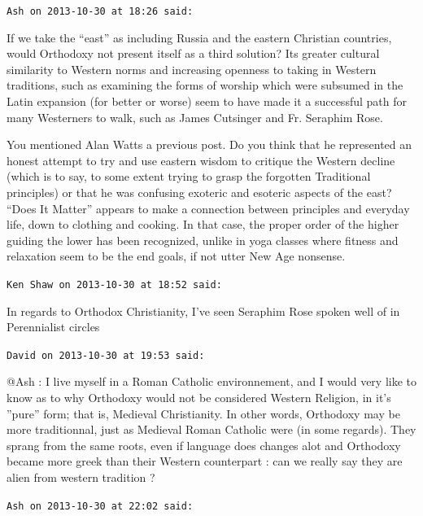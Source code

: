 \begin{footnotesize}
\begin{sffamily}
\hfill

\texttt{Ash on 2013-10-30 at 18:26 said:}

If we take the ``east'' as including Russia and the eastern Christian countries, would Orthodoxy not present itself as a third solution? Its greater cultural similarity to Western norms and increasing openness to taking in Western traditions, such as examining the forms of worship which were subsumed in the Latin expansion (for better or worse) seem to have made it a successful path for many Westerners to walk, such as James Cutsinger and Fr. Seraphim Rose.

You mentioned Alan Watts a previous post. Do you think that he represented an honest attempt to try and use eastern wisdom to critique the Western decline (which is to say, to some extent trying to grasp the forgotten Traditional principles) or that he was confusing exoteric and esoteric aspects of the east? ``Does It Matter'' appears to make a connection between principles and everyday life, down to clothing and cooking. In that case, the proper order of the higher guiding the lower has been recognized, unlike in yoga classes where fitness and relaxation seem to be the end goals, if not utter New Age nonsense.

\hfill

\texttt{Ken Shaw on 2013-10-30 at 18:52 said:}

In regards to Orthodox Christianity, I've seen Seraphim Rose spoken well of in Perennialist circles

\hfill

\texttt{David on 2013-10-30 at 19:53 said:}

@Ash : I live myself in a Roman Catholic environnement, and I would very like to know as to why Orthodoxy would not be considered Western Religion, in it's ''pure'' form; that is, Medieval Christianity. In other words, Orthodoxy may be more traditionnal, just as Medieval Roman Catholic were (in some regards). They sprang from the same roots, even if language does changes alot and Orthodoxy became more greek than their Western counterpart : can we really say they are alien from western tradition ?

\hfill

\texttt{Ash on 2013-10-30 at 22:02 said:}


\end{sffamily}
\end{footnotesize}
